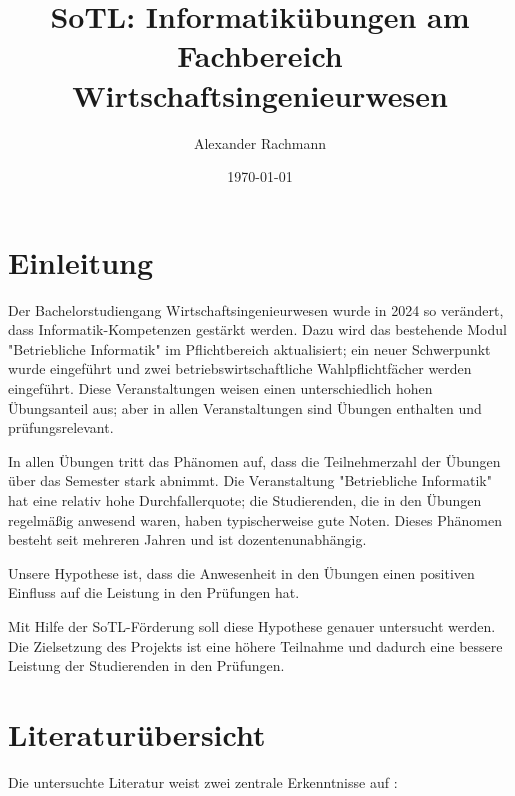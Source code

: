 \documentclass{article}
\title{SoTL: Informatikübungen am Fachbereich Wirtschaftsingenieurwesen}
\author{Alexander Rachmann}
\date{\today}
\begin{document}
\maketitle

\section{Einleitung}
Der Bachelorstudiengang Wirtschaftsingenieurwesen wurde in 2024 so verändert, dass Informatik-Kompetenzen gestärkt werden. Dazu wird das bestehende Modul "Betriebliche Informatik" im Pflichtbereich aktualisiert; ein neuer Schwerpunkt wurde eingeführt und zwei betriebswirtschaftliche Wahlpflichtfächer werden eingeführt. Diese Veranstaltungen weisen einen unterschiedlich hohen Übungsanteil aus; aber in allen Veranstaltungen sind Übungen enthalten und prüfungsrelevant.

In allen Übungen tritt das Phänomen auf, dass die Teilnehmerzahl der Übungen über das Semester stark abnimmt. Die Veranstaltung "Betriebliche Informatik" hat eine relativ hohe Durchfallerquote; die Studierenden, die in den Übungen regelmäßig anwesend waren, haben typischerweise gute Noten. Dieses Phänomen besteht seit mehreren Jahren und ist dozentenunabhängig.

Unsere Hypothese ist, dass die Anwesenheit in den Übungen einen positiven Einfluss auf die Leistung in den Prüfungen hat. 

Mit Hilfe der SoTL-Förderung soll diese Hypothese genauer untersucht werden. Die Zielsetzung des Projekts ist eine höhere Teilnahme und dadurch eine bessere Leistung der Studierenden in den Prüfungen.



\section{Literaturübersicht}


Die untersuchte Literatur weist zwei zentrale Erkenntnisse auf
\cite{10.1145/2843043.2843061}\cite{10.1145/1539024.1508923}\cite{narula2013relationship}\cite{yao2011correlation}\cite{Hafeez_Khan_Jawaid_Haroon_2014}:
\end{document}
